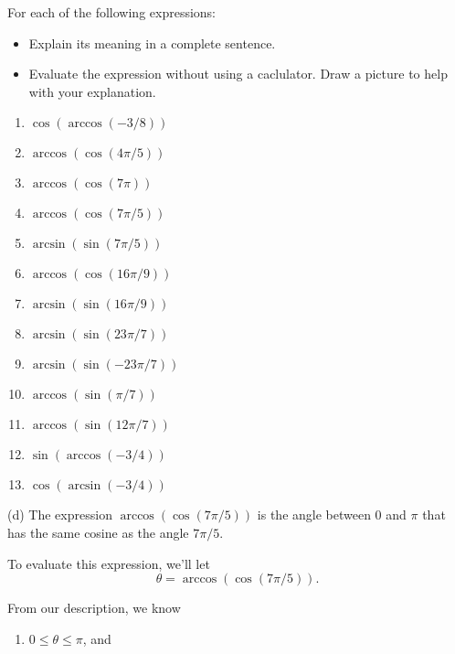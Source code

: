 \documentclass{ximera}
\begin{document}
\begin{question} \label{Q34d4r34fttgFG}
For each of the following expressions:
\begin{itemize}
\item Explain its meaning in a complete sentence.

\item Evaluate the expression without using a caclulator. Draw a picture to help with your explanation.
\end{itemize}

\begin{enumerate}
\item $\cos (\arccos(-3/8))$

\item $\arccos (\cos (4\pi/5))$

\item $\arccos (\cos (7\pi))$

\item $\arccos (\cos (7\pi/5))$

\item $\arcsin (\sin (7\pi/5))$

\item $\arccos (\cos (16\pi/9))$

\item $\arcsin (\sin (16\pi/9))$

\item $\arcsin(\sin (23\pi /7))$

\item $\arcsin(\sin (-23\pi /7))$

\item $\arccos(\sin (\pi /7))$

\item $\arccos(\sin (12\pi /7))$

\item $\sin(\arccos(-3/4))$

\item $\cos(\arcsin(-3/4))$
\end{enumerate}

\begin{explanation}
(d) The expression $\arccos (\cos (7\pi/5))$ is the angle between $0$ and $\pi$ that has the same cosine as the angle $7\pi/5$.

To evaluate this expression, we'll let 
\[
   \theta = \arccos (\cos (7\pi/5)).
\] 

From our description, we know
\begin{enumerate}
\item $0 \leq \theta \leq \pi$, and


\end{enumerate}
\end{explanation}
\end{question}
\end{document}
